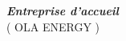 \documentclass[a4paper, oneside, 12pt, final]{extreport}
\newcommand{\studyDepartment} {%
  OLA ENERGY%
}
\begin{document}
\begin{titlepage}
\begin{center}


\vspace{30pt}%
\textbf{\textit{Entreprise d'accueil}}\\

\vspace{10pt}
(\studyDepartment)\\
\end{center}
\end{titlepage}

%



\end{document}
